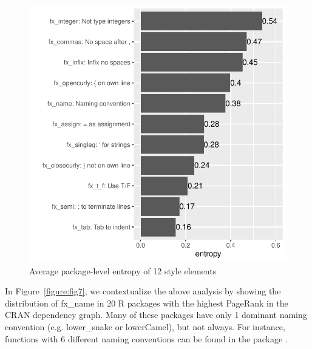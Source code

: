 \begin{figure}[htbp]
  \centering
  \includegraphics{fig6}
  \caption{Average package-level entropy of 12 style elements}
  \label{figure:fig6}
\end{figure}

In Figure~\ref{figure:fig7}, we contextualize the above analysis by showing the distribution of fx\_name in 20 R packages with the highest PageRank \citep{page1999pagerank} in the CRAN dependency graph. Many of these packages have only 1 dominant naming convention (e.g. lower\_snake or lowerCamel), but not always. For instance, functions with 6 different naming conventions can be found in the package .

